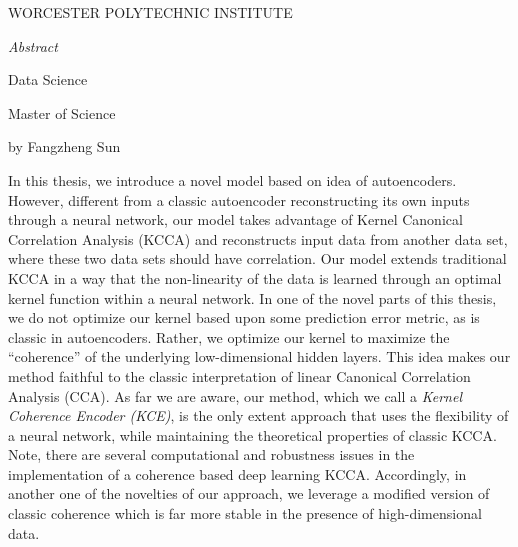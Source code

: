 \documentclass[12pt]{report} %
\begin{document}
\begin{center}
	WORCESTER POLYTECHNIC INSTITUTE\\
	\vspace{1 in}
	\begin{Large}
		\emph{Abstract}\\
	\end{Large}
	\vspace{30 bp}
	\begin{small}
		Data Science\\
	\end{small}
	\vspace{15 bp}
	\begin{small}
		Master of Science\\
	\end{small}
	\vspace{15 bp}
	\begin{small}
		by Fangzheng Sun\\
	\end{small}
\end{center}
In this thesis, we introduce a novel model based on idea of autoencoders. However, different from a classic autoencoder reconstructing its own inputs through a neural network, our model takes advantage of Kernel Canonical Correlation Analysis (KCCA) and reconstructs input data from another data set, where these two data sets should have correlation. Our model extends traditional KCCA in a way that the non-linearity of the data is learned through an optimal kernel function within a neural network. In one of the novel parts of this thesis, we do not optimize our kernel based upon some prediction error metric, as is classic in autoencoders. Rather, we optimize our kernel to maximize the ``coherence'' of the underlying low-dimensional hidden layers. This idea makes our method faithful to the classic interpretation of linear Canonical Correlation Analysis (CCA). 
As far we are aware, our method, which we call a \textit{Kernel Coherence Encoder (KCE)},  is the only extent approach that uses the flexibility of a neural network, while maintaining the theoretical properties of classic KCCA. Note, there are several computational and robustness issues in the implementation of a coherence based deep learning KCCA. Accordingly, in another one of the novelties of our approach, we leverage a modified version of classic coherence which is far more stable in the presence of high-dimensional data.

\clearpage
\end{document}
